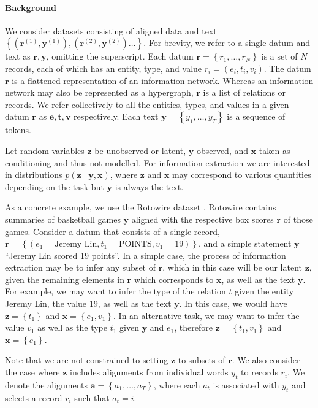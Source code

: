 \documentclass[11pt]{article}
\newcommand\set[1]{\left\{#1\right\}}
\newcommand{\ba}{\mathbf{a}}
\newcommand{\be}{\mathbf{e}}
\newcommand{\br}{\mathbf{r}}
\newcommand{\bt}{\mathbf{t}}
\newcommand{\bv}{\mathbf{v}}
\newcommand{\bx}{\mathbf{x}}
\newcommand{\by}{\mathbf{y}}
\newcommand{\bz}{\mathbf{z}}
\begin{document}
\paragraph{Background}
We consider datasets consisting of aligned data and text
$\set{(\br^{(1)}, \by^{(1)}),(\br^{(2)},\by^{(2)})\ldots}$.
For brevity, we refer to a single datum and text as $\br,\by$, omitting the superscript.
Each datum $\br = \set{r_1,\ldots,r_N}$ is a set of $N$ records, each of which has
an entity, type, and value $r_i = (e_i, t_i, v_i)$.
The datum $\br$ is a flattened representation of an information network.
Whereas an information network may also be represented as a hypergraph,
$\br$ is a list of relations or records.
We refer collectively to all the entities, types, and values in a given datum $\br$ as
$\be,\bt,\bv$ respectively.
Each text $\by = \set{y_1,\ldots,y_T}$ is a sequence of tokens.

Let random variables $\bz$ be unobserved or latent, $\by$ observed, and $\bx$ taken as conditioning
and thus not modelled.
For information extraction we are interested in distributions $p(\bz\mid\by,\bx)$,
where $\bz$ and $\bx$ may correspond to various quantities depending on the task
but $\by$ is always the text.

As a concrete example, we use the Rotowire dataset \citep{wiseman2017d2t}.
Rotowire contains summaries of basketball games $\by$ aligned with the respective
box scores $\br$ of those games.
Consider a datum that consists of a single record,
$\br = \set{(e_1 = \textrm{Jeremy Lin}, t_1 = \textrm{POINTS}, v_1 = 19)}$,
and a simple statement $\by = $``Jeremy Lin scored 19 points''.
In a simple case, the process of information extraction may be to infer any
subset of $\br$, which in this case will be our latent $\bz$, given the remaining elements in $\br$
which corresponds to $\bx$,
as well as the text $\by$.
For example, we may want to infer the type of the relation $t$ given 
the entity Jeremy Lin, the value 19, as well as the text $\by$.
In this case, we would have $\bz = \set{t_1}$ and $\bx = \set{e_1,v_1}$.
In an alternative task, we may want to infer the value $v_1$ 
as well as the type $t_1$ given $\by$ and $e_1$, therefore $\bz = \set{t_1,v_1}$ and $\bx=\set{e_1}$.

Note that we are not constrained to setting $\bz$ to subsets of $\br$.
We also consider the case where $\bz$ includes alignments from individual words $y_t$
to records $r_i$. We denote the alignments $\ba = \set{a_1,\ldots,a_T}$,
where each $a_t$ is associated with $y_t$ and selects a record $r_i$ such that $a_t = i$.
\end{document}
